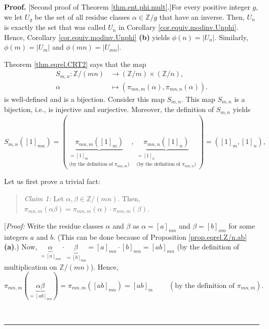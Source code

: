 \documentclass[numbers=enddot,12pt,final,onecolumn,notitlepage]{scrartcl}%
\numberwithin{exer}{subsection}
\theoremstyle{definition}
\newenvironment{statement}{\begin{quote}}{\end{quote}}
\newenvironment{proof}[1][Proof]{\noindent\textbf{#1.} }{\ \rule{0.5em}{0.5em}}
\begin{document}
\begin{proof}
[Second proof of Theorem \ref{thm.ent.phi.mult}.]For every positive integer
$g$, we let $U_{g}$ be the set of all residue classes $\alpha\in\mathbb{Z}/g$
that have an inverse. Then, $U_{n}$ is exactly the set that was called $U_{n}$
in Corollary \ref{cor.equiv.modinv.Unphi}. Hence, Corollary
\ref{cor.equiv.modinv.Unphi} \textbf{(b)} yields $\phi\left(  n\right)
=\left\vert U_{n}\right\vert $. Similarly, $\phi\left(  m\right)  =\left\vert
U_{m}\right\vert $ and $\phi\left(  mn\right)  =\left\vert U_{mn}\right\vert $.

Theorem \ref{thm.eqrel.CRT2} says that the map%
\begin{align*}
S_{m,n}:\mathbb{Z}/\left(  mn\right)   &  \rightarrow\left(  \mathbb{Z}%
/m\right)  \times\left(  \mathbb{Z}/n\right)  ,\\
\alpha &  \mapsto\left(  \pi_{mn,m}\left(  \alpha\right)  ,\pi_{mn,n}\left(
\alpha\right)  \right)  .
\end{align*}
is well-defined and is a bijection. Consider this map $S_{m,n}$. This map
$S_{m,n}$ is a bijection, i.e., is injective and surjective. Moreover, the
definition of $S_{m,n}$ yields%
\[
S_{m,n}\left(  \left[  1\right]  _{mn}\right)  =\left(  \underbrace{\pi
_{mn,m}\left(  \left[  1\right]  _{m}\right)  }_{\substack{=\left[  1\right]
_{m}\\\text{(by the definition of }\pi_{mn,m}\text{)}}},\underbrace{\pi
_{mn,n}\left(  \left[  1\right]  _{n}\right)  }_{\substack{=\left[  1\right]
_{n}\\\text{(by the definition of }\pi_{mn,n}\text{)}}}\right)  =\left(
\left[  1\right]  _{m},\left[  1\right]  _{n}\right)  ,
\]


Let us first prove a trivial fact:

\begin{statement}
\textit{Claim 1:} Let $\alpha,\beta\in\mathbb{Z}/\left(  mn\right)  $. Then,
$\pi_{mn,m}\left(  \alpha\beta\right)  =\pi_{mn,m}\left(  \alpha\right)
\cdot\pi_{mn,m}\left(  \beta\right)  $.
\end{statement}

[\textit{Proof:} Write the residue classes $\alpha$ and $\beta$ as
$\alpha=\left[  a\right]  _{mn}$ and $\beta=\left[  b\right]  _{mn}$ for some
integers $a$ and $b$. (This can be done because of Proposition
\ref{prop.eqrel.Z/n.ab} \textbf{(a)}.) Now, $\underbrace{\alpha}_{=\left[
a\right]  _{mn}}\cdot\underbrace{\beta}_{=\left[  b\right]  _{mn}}=\left[
a\right]  _{mn}\cdot\left[  b\right]  _{mn}=\left[  ab\right]  _{mn}$ (by the
definition of multiplication on $\mathbb{Z}/\left(  mn\right)  $). Hence,
\[
\pi_{mn,m}\left(  \underbrace{\alpha\beta}_{=\left[  ab\right]  _{mn}}\right)
=\pi_{mn,m}\left(  \left[  ab\right]  _{mn}\right)  =\left[  ab\right]
_{m}\ \ \ \ \ \ \ \ \ \ \left(  \text{by the definition of }\pi_{mn,m}\right)
.
\]



\end{proof}
\end{document}
